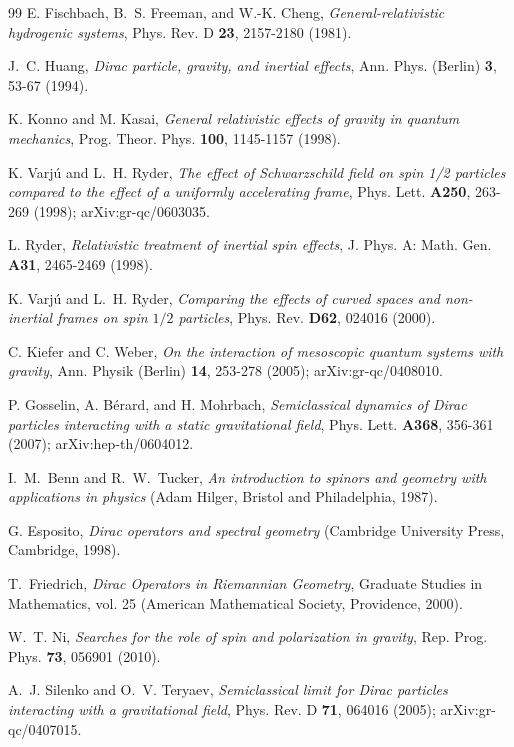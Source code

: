 \documentclass[preprint,showpacs,preprintnumbers,eqsecnum,amsmath,amssymb]{revtex4-1}
\begin{document}
\begin{thebibliography}{99}
E. Fischbach, B.~S. Freeman, and W.-K. Cheng,
{\it General-relativistic hydrogenic systems},
Phys. Rev. D {\bf 23}, 2157-2180 (1981). %

J.~C. Huang, {\it Dirac particle, gravity, and inertial effects},
Ann. Phys. (Berlin) {\bf 3}, 53-67 (1994). %

K. Konno and M. Kasai,
{\it General relativistic effects of gravity in quantum mechanics},
Prog. Theor. Phys. {\bf 100}, 1145-1157 (1998). %

K. Varj\'u and L.~H. Ryder, {\it The effect of Schwarzschild field on spin
1/2 particles compared to the effect of a uniformly accelerating frame},
Phys. Lett. {\bf A250}, 263-269 (1998); %
arXiv:gr-qc/0603035.

L. Ryder, {\it Relativistic treatment of inertial spin effects},
J. Phys. A: Math. Gen. {\bf A31}, 2465-2469 (1998). %

K. Varj\'u and L.~H. Ryder, {\it Comparing the effects of curved spaces and
non-inertial frames on spin $1/2$ particles},
Phys. Rev. {\bf D62}, 024016 (2000). %

C. Kiefer and C. Weber,
{\it On the interaction of mesoscopic quantum systems with gravity},
Ann. Physik (Berlin) {\bf 14}, 253-278 (2005); %
arXiv:gr-qc/0408010.

P. Gosselin, A. B\'erard, and H. Mohrbach, {\it Semiclassical dynamics of
Dirac particles interacting with a static gravitational field},
Phys. Lett. {\bf A368}, 356-361 (2007); %
arXiv:hep-th/0604012.

I.~M.~Benn and R.~W.~Tucker, {\it An introduction to spinors and geometry with
applications in physics} (Adam Hilger, Bristol and Philadelphia, 1987).

G. Esposito, {\it Dirac operators and spectral geometry} (Cambridge University Press,
Cambridge, 1998).

T.~Friedrich, {\it Dirac Operators in Riemannian Geometry}, Graduate Studies in
Mathematics, vol. 25 (American Mathematical Society, Providence, 2000).

W.~T. Ni, {\it Searches for the role of spin and polarization in gravity},
Rep. Prog. Phys. {\bf 73}, 056901 (2010). %

A.~J. Silenko and O.~V. Teryaev, {\it Semiclassical limit for Dirac
particles interacting with a gravitational field},
Phys. Rev. D {\bf 71}, 064016 (2005); arXiv:gr-qc/0407015.


\end{thebibliography}
\end{document}
